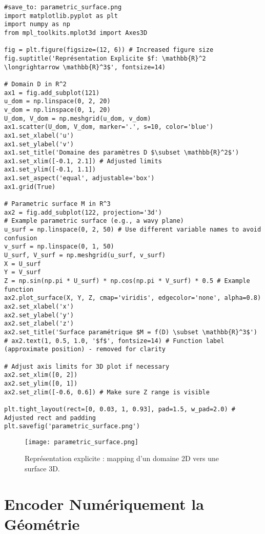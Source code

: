 \documentclass{article}
\begin{document}
\begin{verbatim}
#save_to: parametric_surface.png
import matplotlib.pyplot as plt
import numpy as np
from mpl_toolkits.mplot3d import Axes3D

fig = plt.figure(figsize=(12, 6)) # Increased figure size
fig.suptitle('Représentation Explicite $f: \mathbb{R}^2 \longrightarrow \mathbb{R}^3$', fontsize=14)

# Domain D in R^2
ax1 = fig.add_subplot(121)
u_dom = np.linspace(0, 2, 20)
v_dom = np.linspace(0, 1, 20)
U_dom, V_dom = np.meshgrid(u_dom, v_dom)
ax1.scatter(U_dom, V_dom, marker='.', s=10, color='blue')
ax1.set_xlabel('u')
ax1.set_ylabel('v')
ax1.set_title('Domaine des paramètres D $\subset \mathbb{R}^2$')
ax1.set_xlim([-0.1, 2.1]) # Adjusted limits
ax1.set_ylim([-0.1, 1.1])
ax1.set_aspect('equal', adjustable='box')
ax1.grid(True)

# Parametric surface M in R^3
ax2 = fig.add_subplot(122, projection='3d')
# Example parametric surface (e.g., a wavy plane)
u_surf = np.linspace(0, 2, 50) # Use different variable names to avoid confusion
v_surf = np.linspace(0, 1, 50)
U_surf, V_surf = np.meshgrid(u_surf, v_surf)
X = U_surf
Y = V_surf
Z = np.sin(np.pi * U_surf) * np.cos(np.pi * V_surf) * 0.5 # Example function
ax2.plot_surface(X, Y, Z, cmap='viridis', edgecolor='none', alpha=0.8)
ax2.set_xlabel('x')
ax2.set_ylabel('y')
ax2.set_zlabel('z')
ax2.set_title('Surface paramétrique $M = f(D) \subset \mathbb{R}^3$')
# ax2.text(1, 0.5, 1.0, '$f$', fontsize=14) # Function label (approximate position) - removed for clarity

# Adjust axis limits for 3D plot if necessary
ax2.set_xlim([0, 2])
ax2.set_ylim([0, 1])
ax2.set_zlim([-0.6, 0.6]) # Make sure Z range is visible

plt.tight_layout(rect=[0, 0.03, 1, 0.93], pad=1.5, w_pad=2.0) # Adjusted rect and padding
plt.savefig('parametric_surface.png')
\end{verbatim}

\begin{figure}[H]
\centering
\texttt{[image: parametric\_surface.png]}
\caption{Représentation explicite : mapping d'un domaine 2D vers une surface 3D.}
\label{fig:parametric_surface}
\end{figure}


\section{Encoder Numériquement la Géométrie}
\end{document}
